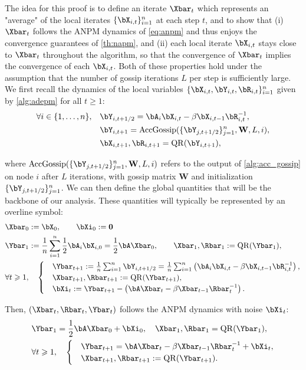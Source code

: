 \documentclass{article}
\theoremstyle{plain}
\theoremstyle{definition}
\theoremstyle{remark}
\begin{document}
The idea for this proof is to define an iterate $\Xbar_t$ which represents an "average" of the local iterates $\{\bX_{i,t}\}_{i=1}^n$ at each step $t$, and to show that (i) $\Xbar_t$ follows the ANPM dynamics of \eqref{eq:anpm} and thus enjoys the convergence guarantees of \cref{th:napm}, and (ii) each local iterate $\bX_{i,t}$ stays close to $\Xbar_t$ throughout the algorithm, so that the convergence of $\Xbar_t$ implies the convergence of each $\bX_{i,t}$. Both of these properties hold under the assumption that the number of gossip iterations $L$ per step is sufficiently large. We  first recall the dynamics of the local variables $\{\bX_{i,t}, \bY_{i,t}, \bR_{i,t}\}_{i=1}^n$ given by \cref{alg:adepm} for all $t\geqslant 1$:
\begin{align*}
  \forall i \in \{1, \dots, n\}, \quad & \bY_{i,t+1/2} = \bA_i \bX_{i,t} - \beta \bX_{i,t-1} \bR_{i,t}^{-1}, \\
  & \bY_{i,t+1} = \mathrm{AccGossip}(\{\bY_{j,t+1/2}\}_{j=1}^n, \mathbf{W}, L, i), \\
  & \bX_{i,t+1}, \bR_{i,t+1} = \mathrm{QR}(\bY_{i,t+1}),
\end{align*}

where $\mathrm{AccGossip}(\{\bY_{j,t+1/2}\}_{j=1}^n, \mathbf{W}, L, i)$ refers to the output of \cref{alg:acc_gossip} on node $i$ after $L$ iterations, with gossip matrix $\mathbf{W}$ and initialization $\{\bY_{j,t+1/2}\}_{j=1}^n$. We can then define the global quantities that will be the backbone of our analysis. These quantities will typically be represented by an overline symbol:
\begin{align}
  & \Xbar_0 := \bX_0, \qquad \bXi_0 := \mathbf{0} \nonumber\\
  & \Ybar_1 := \frac{1}{n} \sum_{i=1}^n \frac{1}{2}\bA_i \bX_{i,0} = \frac{1}{2}\bA\Xbar_0, \qquad \Xbar_1, \Rbar_1 := \mathrm{QR}(\Ybar_1), \nonumber\\
  & \forall t \geqslant 1, \quad \begin{cases}
    & \Ybar_{t+1} := \frac{1}{n}\sum_{i=1}^n \bY_{i,t+1/2} = \frac{1}{n} \sum_{i=1}^n \left( \bA_i\bX_{i,t} - \beta\bX_{i,t-1}\bR_{i,t}^{-1} \right), \\
  & \Xbar_{t+1}, \Rbar_{t+1} := \mathrm{QR}(\Ybar_{t+1}), \\
  & \bXi_{t} := \Ybar_{t+1} - \left( \bA \Xbar_t - \beta \Xbar_{t-1} \Rbar_t^{-1} \right).
  \end{cases} \label{eq:adepm_anpm}
\end{align}

Then, $(\Xbar_t, \Rbar_t, \Ybar_t)$ follows the ANPM dynamics with noise $\bXi_t$:
\begin{align}
  & \Ybar_1 = \frac{1}{2}\bA \Xbar_0 + \bXi_0, \quad \Xbar_1, \Rbar_1 = \mathrm{QR}(\Ybar_1),\nonumber \\
  & \forall t \geqslant 1, \quad \begin{cases}
    & \Ybar_{t+1} = \bA \Xbar_t - \beta \Xbar_{t-1} \Rbar_t^{-1} + \bXi_t, \\
  & \Xbar_{t+1}, \Rbar_{t+1} := \mathrm{QR}(\Ybar_{t+1}).
  \end{cases} \label{eq:xbar_anpm}
\end{align}
\end{document}
